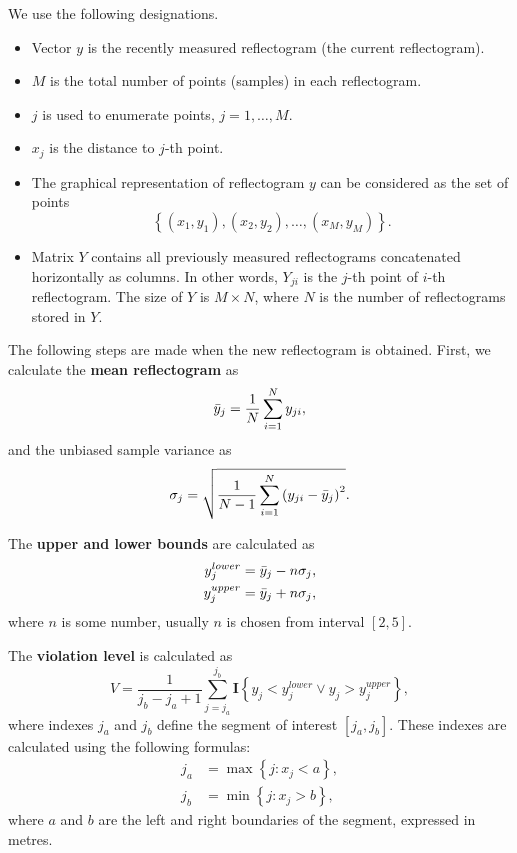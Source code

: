 	We use the following designations.
	\begin{itemize}
		\item Vector $y$ is the recently measured reflectogram (the current reflectogram).
		\item $M$ is the total number of points (samples) in each reflectogram. 
		\item $j$ is used to enumerate points, $j = 1, \ldots, M$. 
		\item $x_j$ is the distance to $j$-th point.
		\item The graphical representation of reflectogram $y$ can be considered as the set of points
		\begin{equation*}
			\left\{(x_1, y_1), (x_2, y_2), \dots, (x_M, y_M)\right\}.
		\end{equation*}
		\item Matrix $Y$ contains all previously measured reflectograms concatenated horizontally as columns. In other words, $Y_{ji}$ is the $j$-th point of $i$-th reflectogram. The size of $Y$ is $M \times N$, where $N$ is the number of reflectograms stored in $Y$.
	\end{itemize}		
	
	The following steps are made when the new reflectogram is obtained.
	First, we calculate the \textbf{mean reflectogram} as 
	\begin{equation}
		\bar{y}_j = \frac{1}{N}\sum\limits_{i=1}^{N} y_{ji},
	\end{equation}
	and the unbiased sample variance as
	\begin{equation}
		\sigma_{j} = \sqrt{\frac{1}{N-1}\sum\limits_{i=1}^{N} \left(y_{ji} - \bar{y}_j\right)^2}.
	\end{equation}

	The \textbf{upper and lower bounds} are calculated as
	\begin{align}\label{eq:y_lower_upped_def}
		y^{lower}_{j} &= \bar{y}_j - n\sigma_{j}, \\
		y^{upper}_{j} &= \bar{y}_j + n\sigma_{j},
	\end{align}
	where $n$ is some number, usually $n$ is chosen from interval $\left[2, 5\right]$.
	
		
	The \textbf{violation level} is calculated as
	\begin{equation}
		V = \frac{1}{j_b - j_a + 1}\sum\limits_{j=j_a}^{j_b} \mathbf{I}\left\{y_{j} < y^{lower}_j \lor y_{j} > y^{upper}_j\right\},
	\end{equation}
	where indexes $j_a$ and $j_b$ define the segment of interest $\left[j_a, j_b\right]$. These indexes are calculated using the following formulas:
	\begin{align}
		j_a &= \max \left\{j: x_j < a\right\}, \\
		j_b &= \min \left\{j: x_j > b\right\},
	\end{align}
	where $a$ and $b$ are the left and right boundaries of the segment, expressed in metres.
	
